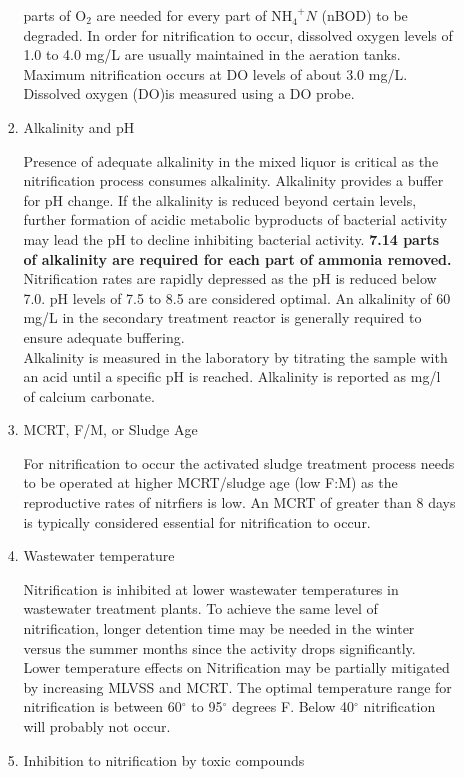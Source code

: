 \begin{enumerate}
\begin{enumerate}[label=\alph*]
\begin{enumerate}
 parts of O$_2$ are needed for every part of NH$_4^{\enspace +}N$ (nBOD) to be degraded. In order for nitrification to occur, dissolved oxygen levels of 1.0 to 4.0 mg/L are usually maintained in the aeration tanks.  Maximum nitrification occurs at DO levels of about 3.0 mg/L.  Dissolved oxygen (DO)is measured using a DO probe.  

\item Alkalinity and pH

\noindent Presence of adequate alkalinity in the mixed liquor is critical as the nitrification process consumes alkalinity.  Alkalinity provides a buffer for pH change.  If the alkalinity is reduced beyond certain levels, further formation of acidic metabolic byproducts of bacterial activity may lead the pH to decline inhibiting bacterial activity. \textbf{7.14 parts of alkalinity are required for each part of ammonia removed.}    Nitrification rates are rapidly depressed as the pH is reduced below 7.0. pH levels of 7.5 to 8.5 are considered optimal. An alkalinity of 60 mg/L in the secondary treatment reactor is generally required to ensure adequate buffering.\\

Alkalinity is measured in the laboratory by titrating the sample with an acid until a specific pH is reached.  Alkalinity is reported as mg/l of calcium carbonate.

 
\item MCRT, F/M, or Sludge Age

\noindent For nitrification to occur the activated sludge treatment process needs to be operated at higher MCRT/sludge age (low F:M) as the reproductive rates of nitrfiers is low.  An MCRT of greater than 8 days is typically considered essential for nitrification to occur.


\item Wastewater temperature

\noindent Nitrification is inhibited at lower wastewater temperatures in wastewater treatment plants. To achieve the same level of nitrification, longer detention time may be needed in the winter versus the summer months since the activity drops significantly.  Lower temperature effects on Nitrification may be partially mitigated by increasing MLVSS and MCRT.  The optimal temperature range for nitrification is between 60$^{\circ}$  to 95$^{\circ}$  degrees F. Below 40$^{\circ}$  nitrification will probably not occur.

\item Inhibition to nitrification by toxic compounds


\end{enumerate}
\end{enumerate}
\end{enumerate}
